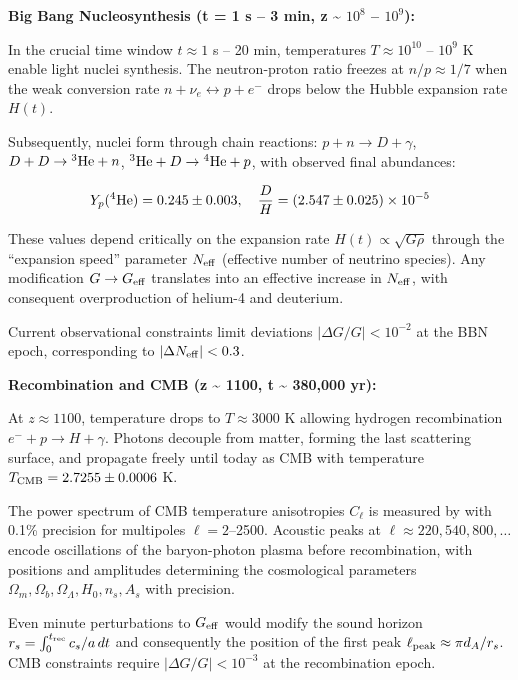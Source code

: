 \documentclass[11pt,a4paper]{article}
\begin{document}
\textbf{Big Bang Nucleosynthesis (t = 1 s -- 3 min, z \textasciitilde{}
$10^{8}$ -- $10^{9}$):}

In the crucial time window \(t \approx 1\) s -- 20 min, temperatures
\(T \approx 10^{10}\) -- \(10^9\) K enable light nuclei synthesis. The
neutron-proton ratio freezes at \(n/p \approx 1/7\) when the weak
conversion rate \(n + \nu_e \leftrightarrow p + e^-\) drops below the
Hubble expansion rate \(H(t)\).

Subsequently, nuclei form through chain reactions:
\(p + n \to D + \gamma\), \(D + D \to {}^3{\rm He} + n\),
\({}^3{\rm He} + D \to {}^4{\rm He} + p\), with observed final
abundances:

\[Y_p({}^4{\rm He}) = 0.245 \pm 0.003, \quad \frac{D}{H} = (2.547 \pm 0.025) \times 10^{-5}\]

These values depend critically on the expansion rate
\(H(t) \propto \sqrt{G \rho}\) through the ``expansion speed'' parameter
\(N_{\rm eff}\) (effective number of neutrino species). Any modification
\(G \to G_{\rm eff}\) translates into an effective increase in
\(N_{\rm eff}\), with consequent overproduction of helium-4 and
deuterium.

Current observational constraints limit deviations
\(|\Delta G/G| < 10^{-2}\) at the BBN epoch, corresponding to
\(|\Delta N_{\rm eff}| < 0.3\).

\textbf{Recombination and CMB (z \textasciitilde{} 1100, t
\textasciitilde{} 380,000 yr):}

At \(z \approx 1100\), temperature drops to \(T \approx 3000\) K
allowing hydrogen recombination \(e^- + p \to H + \gamma\). Photons
decouple from matter, forming the last scattering surface, and propagate
freely until today as CMB with temperature
\(T_{\rm CMB} = 2.7255 \pm 0.0006\) K.

The power spectrum of CMB temperature anisotropies \(C_\ell\) is
measured by \cite{PlanckCollaboration2020a} with 0.1\% precision for multipoles
\(\ell = 2\)--2500. Acoustic peaks at
\(\ell \approx 220, 540, 800, \ldots\) encode oscillations of the
baryon-photon plasma before recombination, with positions and amplitudes
determining the cosmological parameters
\(\Omega_m, \Omega_b, \Omega_\Lambda, H_0, n_s, A_s\) with precision.

Even minute perturbations to \(G_{\rm eff}\) would modify the sound
horizon \(r_s = \int_0^{t_{\rm rec}} c_s/a\, dt\) and consequently the
position of the first peak \(\ell_{\rm peak} \approx \pi d_A/r_s\). CMB
constraints require \(|\Delta G/G| < 10^{-3}\) at the recombination
epoch.
\end{document}
